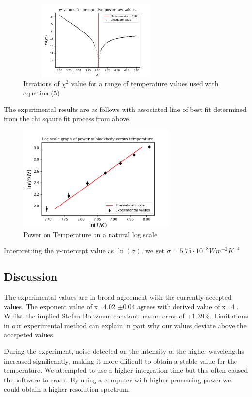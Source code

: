 \documentclass{article}%
\begin{document}
\begin{figure}[H]%
    \centering%
    \includegraphics[width=300px, height=150px]{task4_fig_a.png}%
    \caption{Iterations of $\chi^2$ value for a range of temperature values used with equation (5)}%
    \end{figure}

The experimental results are as follows with associated line of best fit determined from the chi sqaure fit process from above.
\begin{figure}[H]%
  \centering%
  \includegraphics[width=300px]{task4_fig_b.png}%
  \caption{Power on Temperature on a natural log scale}%
  \end{figure}

  Interpretting the y-intercept value as $\ln(\sigma)$, we get $\sigma = 5.75 \cdot 10^{-8} Wm^{-2}K^{-4}$ 

%
\subsection{Discussion}%
\label{subsec:Discussion}%
The experimental values are in broad agreement with the currently accepted values. The exponent value of x=4.02 $\pm 0.04$
agrees with derived value of x=4 \cite{Boltzman}. Whilst the implied Stefan-Boltzman constant has an error of +1.39\%. \cite{Martin}
Limitations in our experimental method can explain in part why our values deviate above the accepeted values. \par

During the experiment, noise detected on the intensity of the higher wavelengths increased significantly, making it more diificult
to obtain a stable value for the temperature. We attempted to use a higher integration time but this often caused the software to crash.
By using a computer with higher processing power we could obtain a higher resolution spectrum. \par
\end{document}
